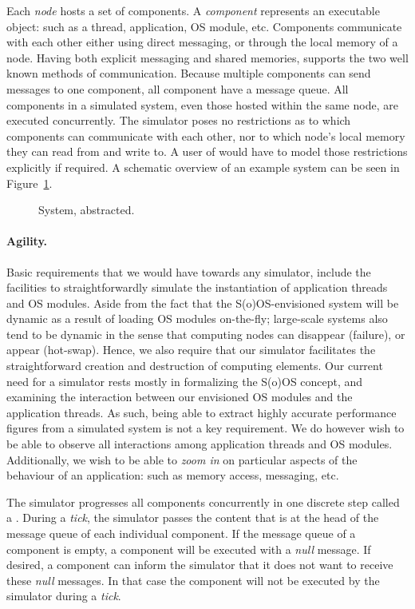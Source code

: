 Each \emph{node} hosts a set of components.  A \emph{component}
represents an executable object: such as a thread, application, OS
module, etc.  Components communicate with each other either using
direct messaging, or through the local memory of a node.  Having both
explicit messaging and shared memories, \soosim supports the two well
known methods of communication.  Because multiple components can send
messages to one component, all component have a message queue.  All
components in a simulated system, even those hosted within the same
node, are executed concurrently.  The simulator poses no restrictions
as to which components can communicate with each other, nor to which
node's local memory they can read from and write to.  A user of
\soosim would have to model those restrictions explicitly if required.
A schematic overview of an example system can be seen in
Figure~\ref{fig:system}.

\def\svgwidth{\columnwidth}
\begin{figure}
%
\caption{System, abstracted.}
\label{fig:system}
\end{figure}

\paragraph{Agility.} Basic requirements that we would have towards
any simulator, include the facilities to straightforwardly simulate
the instantiation of application threads and OS modules.  Aside from
the fact that the S(o)OS-envisioned system will be dynamic as a result
of loading OS modules on-the-fly; large-scale systems also tend to be
dynamic in the sense that computing nodes can disappear (failure), or
appear (hot-swap).  Hence, we also require that our simulator
facilitates the straightforward creation and destruction of computing
elements.  Our current need for a simulator rests mostly in
formalizing the S(o)OS concept, and examining the interaction between
our envisioned OS modules and the application threads.  As such, being
able to extract highly accurate performance figures from a simulated
system is not a key requirement.  We do however wish to be able to
observe all interactions among application threads and OS modules.
Additionally, we wish to be able to \emph{zoom in} on particular
aspects of the behaviour of an application: such as memory access,
messaging, etc.

The simulator progresses all components concurrently in one discrete
step called a .  During a \emph{tick}, the simulator passes
the content that is at the head of the message queue of each
individual component.  If the message queue of a component is empty, a
component will be executed with a \emph{null} message.  If desired, a
component can inform the simulator that it does not want to receive
these \emph{null} messages.  In that case the component will not be
executed by the simulator during a \emph{tick}.



